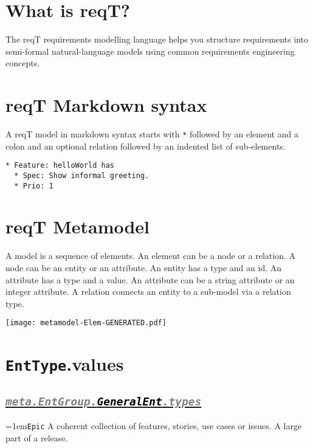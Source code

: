\documentclass[a4paper,oneside]{article}
\newcommand\Concept[2]{\hangindent=1em\lstinline+#1+ #2}
\begin{document}
\fontsize{9.1}{11}\selectfont

\begin{multicols*}{4}
\raggedright

\section*{What is reqT?}
The reqT requirements modelling language 
helps you structure requirements into semi-formal 
natural-language models using 
common requirements engineering concepts.


\section*{reqT Markdown syntax}
A reqT model in markdown syntax starts with \lstinline+*+ followed by an element and a colon and an optional relation followed by an indented list of sub-elements.

\begin{lstlisting}
* Feature: helloWorld has
  * Spec: Show informal greeting.
  * Prio: 1

\end{lstlisting}

\section*{reqT Metamodel}

A model is a sequence of elements. 
An element can be a node or a relation. 
A node can be an entity or an attribute. 
An entity has a type and an id. 
An attribute has a type and a value. 
An attribute can be a string attribute or an integer attribute. 
A relation connects an entity to a sub-model via a relation type.


\noindent\hspace*{-2.1em}\texttt{[image: metamodel-Elem-GENERATED.pdf]}

\section*{\texttt{EntType}.values}
\subsection*{\underline{\texttt{\textit{{\textcolor{gray}{meta.EntGroup.}\textcolor{black}{GeneralEnt}}\textcolor{gray}{.types}}}}}
\Concept{Epic}{A coherent collection of features, stories, use cases or issues. A large part of a release.}


\end{multicols*}
\end{document}
